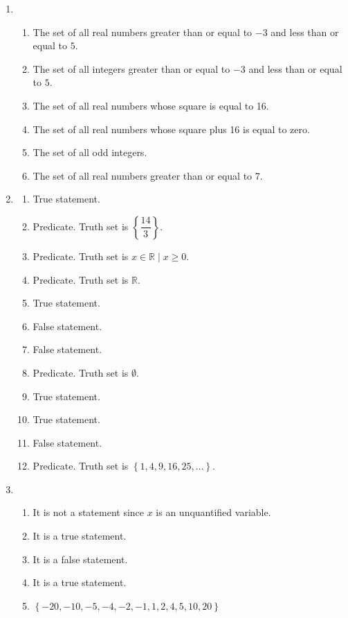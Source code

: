 \begin{enumerate}
\item \begin{enumerate}
\item The set of all real numbers greater than or equal to $-3$ and less than or equal to 
$5$.
\item The set of all integers greater than or equal to $-3$ and less than or equal to 
$5$.
\item The set of all real numbers whose square is equal to 16.
\item The set of all real numbers whose square plus 16 is equal to zero.
\item The set of all odd integers.
\item The set of all real numbers greater than or equal to 7.
\end{enumerate}

\item \begin{multicols}{2}
\begin{enumerate}
\item True statement.
\item Predicate.  Truth set is $\left\{ \dfrac{14}{3} \right\}$.
\item Predicate.  Truth set is $x \in \mathbb{R} \mid x \geq 0$.
\item Predicate.  Truth set is $\mathbb{R}$.
\item True statement.
\item False statement.
\item False statement.
\item Predicate.  Truth set is $\emptyset$.
\item True statement.
\item True statement.
\item False statement.
\item Predicate.  Truth set is $\left\{ 1, 4, 9, 16, 25, \ldots \right\}$.
\end{enumerate}
\end{multicols}

\pagebreak
\item \begin{enumerate}
\item It is not a statement since $x$ is an unquantified variable.
\item It is a true statement.
\item It is a false statement.
\item It is a true statement.
\item $\left\{ -20, -10, -5, -4, -2, -1, 1, 2, 4, 5, 10, 20 \right\}$
\end{enumerate}

\end{enumerate}
\hbreak
\endinput
